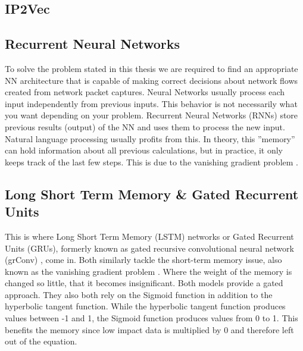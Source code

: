 \documentclass[
	ngerman,
	ruledheaders=section,%
	class=report,%
	thesis={type=bachelor},%
	accentcolor=9c,%
	custommargins=true,%
	marginpar=false,%
	parskip=half-,%
	fontsize=11pt,%
]{tudapub}
\begin{document}
\subsection{IP2Vec}

\subsection{Recurrent Neural Networks}

To solve the problem stated in this thesis we are required to find an appropriate NN architecture
that is capable of making correct decisions about network flows created from network packet captures.
Neural Networks usually process each input independently from previous inputs.
This behavior is not necessarily what you want depending on your problem.
Recurrent Neural Networks (RNNs) store previous results (output) of the NN and uses them to process the new input.
Natural language processing usually profits from this.
In theory, this ''memory'' can hold information about all previous calculations,
but in practice, it only keeps track of the last few steps.
This is due to the vanishing gradient problem \cite{hochreiterLongShortTermMemory1997}.

\subsection{Long Short Term Memory \& Gated Recurrent Units}

This is where Long Short Term Memory (LSTM) networks \cite{hochreiterLongShortTermMemory1997} or Gated Recurrent Units (GRUs), formerly known as gated recursive convolutional neural network (grConv) \cite{bahdanauNeuralMachineTranslation2016}, come in.
Both similarly tackle the short-term memory issue,
also known as the vanishing gradient problem \cite{hochreiterLongShortTermMemory1997}.
Where the weight of the memory is changed so little, that it becomes insignificant.
Both models provide a gated approach.
They also both rely on the Sigmoid function in addition to the hyperbolic tangent function.
While the hyperbolic tangent function produces values between -1 and 1,
the Sigmoid function produces values from 0 to 1.
This benefits the memory since low impact data is multiplied by 0 and therefore left out of the equation.

\end{document}
